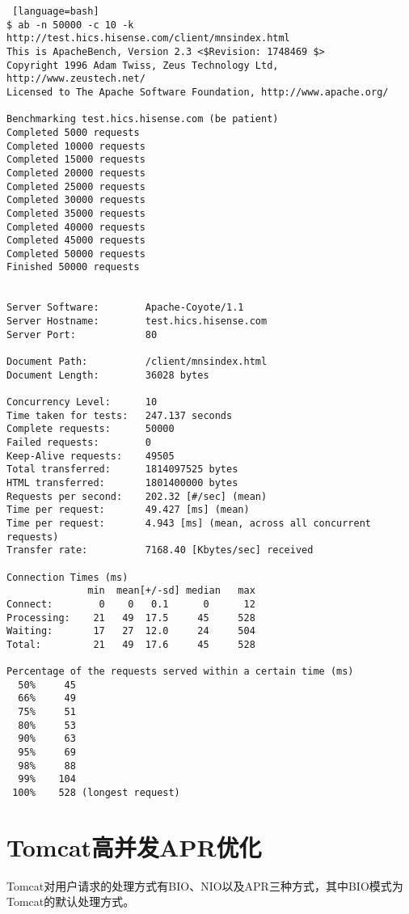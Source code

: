 \begin{lstlisting} [language=bash]
$ ab -n 50000 -c 10 -k http://test.hics.hisense.com/client/mnsindex.html
This is ApacheBench, Version 2.3 <$Revision: 1748469 $>
Copyright 1996 Adam Twiss, Zeus Technology Ltd, http://www.zeustech.net/
Licensed to The Apache Software Foundation, http://www.apache.org/

Benchmarking test.hics.hisense.com (be patient)
Completed 5000 requests
Completed 10000 requests
Completed 15000 requests
Completed 20000 requests
Completed 25000 requests
Completed 30000 requests
Completed 35000 requests
Completed 40000 requests
Completed 45000 requests
Completed 50000 requests
Finished 50000 requests


Server Software:        Apache-Coyote/1.1
Server Hostname:        test.hics.hisense.com
Server Port:            80

Document Path:          /client/mnsindex.html
Document Length:        36028 bytes

Concurrency Level:      10
Time taken for tests:   247.137 seconds
Complete requests:      50000
Failed requests:        0
Keep-Alive requests:    49505
Total transferred:      1814097525 bytes
HTML transferred:       1801400000 bytes
Requests per second:    202.32 [#/sec] (mean)
Time per request:       49.427 [ms] (mean)
Time per request:       4.943 [ms] (mean, across all concurrent requests)
Transfer rate:          7168.40 [Kbytes/sec] received

Connection Times (ms)
              min  mean[+/-sd] median   max
Connect:        0    0   0.1      0      12
Processing:    21   49  17.5     45     528
Waiting:       17   27  12.0     24     504
Total:         21   49  17.6     45     528

Percentage of the requests served within a certain time (ms)
  50%     45
  66%     49
  75%     51
  80%     53
  90%     63
  95%     69
  98%     88
  99%    104
 100%    528 (longest request)
\end{lstlisting}
\section{Tomcat高并发APR优化}
Tomcat对用户请求的处理方式有BIO、NIO以及APR三种方式，其中BIO模式为Tomcat的默认处理方式\cite{vukotic2011securing}。

